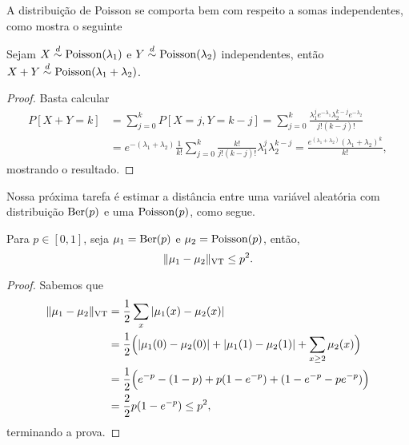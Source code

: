 \begin{topics}
A distribuição de Poisson se comporta bem com respeito a somas independentes, como mostra o seguinte
\begin{lemma}
\label{l:soma_poisson}
Sejam $X \overset{d}\sim \operatorname{Poisson}(\lambda_1)$ e $Y \overset{d}\sim \operatorname{Poisson}(\lambda_2)$ independentes, então $X+Y \overset{d}\sim \operatorname{Poisson}(\lambda_1 + \lambda_2)$.
\end{lemma}

\begin{proof}
Basta calcular
\begin{equation}
  \begin{split}
    P[X+Y = k] & = \sum_{j = 0}^k P[X = j, Y = k-j] = \sum_{j = 0}^k \frac{\lambda_1^j e^{-\lambda_1} \lambda_2^{k-j} e^{-\lambda_2}}{j! (k-j)!}\\
    & = e^{-(\lambda_1 + \lambda_2)} \frac{1}{k!} \sum_{j = 0}^k \frac{k!}{j! (k-j)!} \lambda_1^j \lambda_2^{k-j} = \frac{e^{(\lambda_1 + \lambda_2)} (\lambda_1 + \lambda_2)^k}{k!},
  \end{split}
\end{equation}
mostrando o resultado.
\end{proof}

Nossa próxima tarefa é estimar a distância entre uma variável aleatória com distribuição $\operatorname{Ber}(p)$ e uma $\operatorname{Poisson}(p)$, como segue.

\begin{lemma}
\label{l:vt_ber_poiss}
Para $p \in [0,1]$, seja $\mu_1 = \operatorname{Ber}(p)$ e $\mu_2 = \operatorname{Poisson}(p)$, então,
\begin{equation}
  \lVert \mu_1 - \mu_2 \rVert_{\operatorname{VT}} \leq p^2.
\end{equation}
\end{lemma}

\begin{proof}
Sabemos que
\begin{equation}
  \begin{split}
    \lVert \mu_1 - \mu_2 \rVert_{\operatorname{VT}} & = \frac{1}{2} \sum_{x} |\mu_1(x) - \mu_2(x)|\\
    & = \frac{1}{2} \Big( |\mu_1(0) - \mu_2(0)| + |\mu_1(1) - \mu_2(1)| + \sum_{x \geq 2} \mu_2(x) \Big)\\
    & = \frac{1}{2} \Big( e^{-p} - (1-p) + p(1-e^{-p}) + (1 - e^{-p} - p e^{-p}) \Big)\\
    & = \frac{2}{2} p (1 - e^{-p}) \leq p^2,
  \end{split}
\end{equation}
terminando a prova.
\end{proof}


\end{topics}
